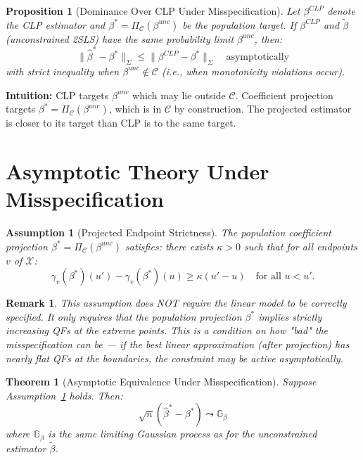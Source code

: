\documentclass[11pt]{article}
\newcommand{\calC}{\mathcal{C}}
\newtheorem{theorem}{Theorem}
\newtheorem{proposition}{Proposition}
\newtheorem{remark}{Remark}
\newtheorem{assumption}{Assumption}
\begin{document}
\begin{proposition}[Dominance Over CLP Under Misspecification]
Let $\beta^{CLP}$ denote the CLP estimator and $\beta^* = \Pi_\calC(\beta^{unc})$ be the population target. If $\beta^{CLP}$ and $\tilde{\beta}$ (unconstrained 2SLS) have the same probability limit $\beta^{unc}$, then:
\[
\|\hat{\beta}^* - \beta^*\|_\Sigma \leq \|\beta^{CLP} - \beta^*\|_\Sigma \quad \text{asymptotically}
\]
with strict inequality when $\beta^{unc} \notin \calC$ (i.e., when monotonicity violations occur).
\end{proposition}

\textbf{Intuition:} CLP targets $\beta^{unc}$ which may lie outside $\calC$. Coefficient projection targets $\beta^* = \Pi_\calC(\beta^{unc})$, which is in $\calC$ by construction. The projected estimator is closer to its target than CLP is to the same target.

\section{Asymptotic Theory Under Misspecification}

\begin{assumption}[Projected Endpoint Strictness]\label{ass:proj_strict}
The population coefficient projection $\beta^* = \Pi_\calC(\beta^{unc})$ satisfies: there exists $\kappa > 0$ such that for all endpoints $v$ of $\mathcal{X}$:
\[
\gamma_v(\beta^*)(u') - \gamma_v(\beta^*)(u) \geq \kappa(u' - u) \quad \text{for all } u < u'.
\]
\end{assumption}

\begin{remark}
This assumption does NOT require the linear model to be correctly specified. It only requires that the population projection $\beta^*$ implies strictly increasing QFs at the extreme points. This is a condition on how "bad" the misspecification can be — if the best linear approximation (after projection) has nearly flat QFs at the boundaries, the constraint may be active asymptotically.
\end{remark}

\begin{theorem}[Asymptotic Equivalence Under Misspecification]
Suppose Assumption~\ref{ass:proj_strict} holds. Then:
\[
\sqrt{n}(\hat{\beta}^* - \beta^*) \leadsto \mathbb{G}_\beta
\]
where $\mathbb{G}_\beta$ is the same limiting Gaussian process as for the unconstrained estimator $\tilde{\beta}$.
\end{theorem}
\end{document}
